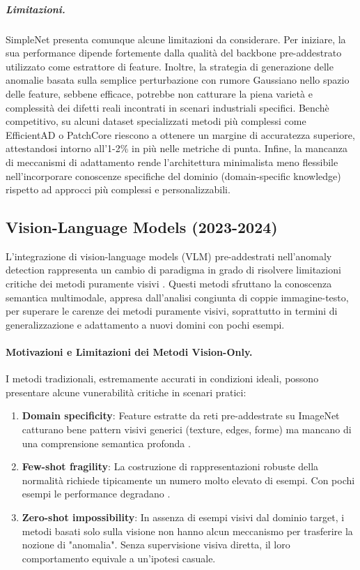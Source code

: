 \subparagraph{Limitazioni.}

SimpleNet presenta comunque alcune limitazioni da considerare. Per iniziare, la sua performance dipende fortemente dalla qualità del backbone pre-addestrato utilizzato come estrattore di feature. Inoltre, la strategia di generazione delle anomalie basata sulla semplice perturbazione con rumore Gaussiano nello spazio delle feature, sebbene efficace, potrebbe non catturare la piena varietà e complessità dei difetti reali incontrati in scenari industriali specifici. Benchè competitivo, su alcuni dataset specializzati metodi più complessi come EfficientAD o PatchCore riescono a ottenere un margine di accuratezza superiore, attestandosi intorno all'1-2\% in più nelle metriche di punta. Infine, la mancanza di meccanismi di adattamento rende l'architettura minimalista meno flessibile nell'incorporare conoscenze specifiche del dominio (domain-specific knowledge) rispetto ad approcci più complessi e personalizzabili.

\subsection{Vision-Language Models (2023-2024)}
\label{subsec:vlm}

L'integrazione di vision-language models (VLM) pre-addestrati nell'anomaly de\-tec\-tion rappresenta un cambio di paradigma in grado di risolvere limitazioni critiche dei metodi puramente visivi \cite{jeong2023winclip, zhou2024anomalyclip}. Questi metodi sfruttano la conoscenza semantica multimodale, appresa dall'analisi congiunta di coppie immagine-testo, per superare le carenze dei metodi puramente visivi, soprattutto in termini di generalizzazione e adattamento a nuovi domini con pochi esempi.

\paragraph{Motivazioni e Limitazioni dei Metodi Vision-Only.} I metodi tra\-di\-zio\-na\-li, estremamente accurati in condizioni ideali, possono presentare alcune vunerabilità critiche in scenari pratici:

\begin{enumerate}
\item \textbf{Domain specificity}: Feature estratte da reti pre-addestrate su ImageNet catturano bene pattern visivi generici (texture, edges, forme) ma mancano di una comprensione semantica profonda \cite{bergmann2022beyond}.

\item \textbf{Few-shot fragility}: La costruzione di rappresentazioni robuste della normalità richiede tipicamente un numero molto elevato di esempi. Con pochi esempi le performance degradano \cite{roth2022towards}.

\item \textbf{Zero-shot impossibility}: In assenza di esempi visivi dal dominio target, i metodi basati solo sulla visione non hanno alcun meccanismo per trasferire la nozione di "anomalia". Senza supervisione visiva diretta, il loro comportamento equivale a un'ipotesi casuale.
\end{enumerate}

